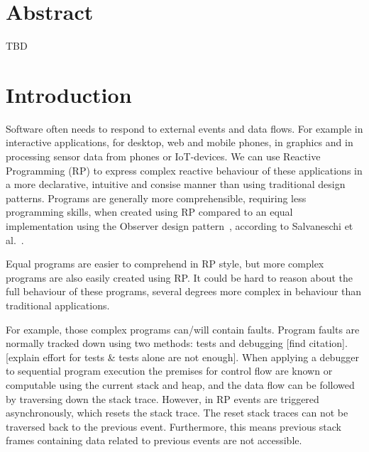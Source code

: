\section{Abstract} TBD




\section{Introduction}%
\label{sec:intro} Software often needs to respond to external events and
data flows.  For example in interactive applications, for desktop, web
and mobile phones, in graphics and in processing sensor data from phones
or IoT-devices.  We can use Reactive Programming (RP) to express complex
reactive behaviour of these applications in a more declarative,
intuitive and consise manner than using traditional design patterns.
Programs are generally more comprehensible, requiring less programming
skills, when created using RP compared to an equal implementation using
the Observer design pattern~\cite{johnson1995design}, according to
Salvaneschi et al.~\cite{salvaneschi2014empirical}.

Equal programs are easier to comprehend in RP style, but more complex
programs are also easily created using RP.  It could be hard to reason
about the full behaviour of these programs, several degrees more complex
in behaviour than traditional applications.

For example, those complex programs can/will contain faults.  Program
faults are normally tracked down using two methods:  tests and debugging
[find citation]. [explain effort for tests \& tests alone are not enough].
When applying a debugger to sequential program execution the premises
for control flow are known or computable using the current stack and
heap, and the data flow can be followed by traversing down the stack
trace.  However, in RP events are triggered asynchronously, which resets
the stack trace.  The reset stack traces can not be traversed back to
the previous event.  Furthermore, this means previous stack frames
containing data related to previous events are not accessible.

